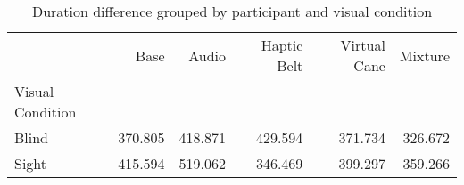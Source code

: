 
\begin{table}[!htb]
\centering
\caption{Duration difference grouped by participant and visual condition}
\label{tab:duracao_average_group}
\begin{tabular}{lrrrrr}
\toprule
{} &    Base &   Audio &  Haptic Belt &  Virtual Cane &  Mixture \\
Visual Condition &         &         &              &               &          \\
\midrule
Blind            & 370.805 & 418.871 &      429.594 &       371.734 &  326.672 \\
Sight            & 415.594 & 519.062 &      346.469 &       399.297 &  359.266 \\
\bottomrule
\end{tabular}
\end{table}

